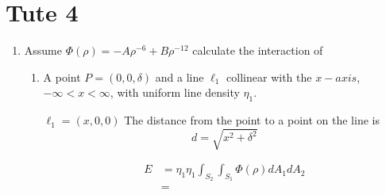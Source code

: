 \documentclass{X:/Documents/Coding/Latex/myassignment}
\begin{document}
\section{Tute 4}
\begin{enumerate}
	\item Assume $\Phi(\rho) = -A \rho^{-6} + B \rho^{-12}$ calculate the interaction of
	\begin{enumerate}
		\item A point $P = (0,0,\delta)$ and a line $\ell_1$ collinear with the $x-axis$, $-\infty < x < \infty$, with uniform line density $\eta_1$.

		$\ell_1 = (x,0,0)$
		The distance from the point to a point on the line is 
		\[d = \sqrt{x^2 + \delta^2}\]

		\begin{align*}
			E &= \eta_1\eta_1 \int_{S_2} \int_{S_1} \Phi(\rho) dA_1 dA_2\\
			&=
		\end{align*}


\end{enumerate}
\end{enumerate}
\end{document}
